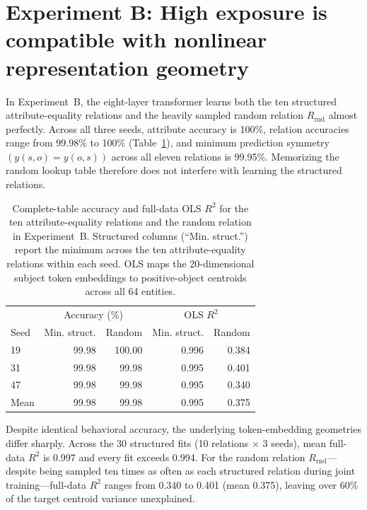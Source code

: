 \documentclass[11pt]{article}
\newcommand{\Rrnd}{R_{\mathrm{rnd}}}
\newcommand{\ExpTwoRandomRsq}{0.375}
\begin{document}
\section{Experiment B: High exposure is compatible with nonlinear representation geometry}
\label{sec:goal2-results}

In Experiment~B, the eight-layer transformer learns both the ten structured
attribute-equality relations and the heavily sampled random relation $\Rrnd$
almost perfectly. Across all three seeds, attribute accuracy is 100\%, relation
accuracies range from 99.98\% to 100\% (Table~\ref{tab:goal2}), and minimum
prediction symmetry $(y(s,o)=y(o,s))$ across all eleven relations is 99.95\%.
Memorizing the random lookup table therefore does not interfere with learning
the structured relations.

\begin{table}[t]
\centering
\small
\setlength{\tabcolsep}{3pt}
\begin{tabular}{lrrrr}
\toprule
 & \multicolumn{2}{c}{Accuracy (\%)} & \multicolumn{2}{c}{OLS $R^2$} \\
Seed & Min. struct. & Random & Min. struct. & Random \\
\midrule
19 & 99.98 & 100.00 & 0.996 & 0.384 \\
31 & 99.98 & 99.98 & 0.995 & 0.401 \\
47 & 99.98 & 99.98 & 0.995 & 0.340 \\
\midrule
Mean & 99.98 & 99.98 & 0.995 & 0.375 \\
\bottomrule
\end{tabular}
\caption{Complete-table accuracy and full-data OLS $R^2$
  for the ten attribute-equality
  relations and the random relation
  in Experiment~B.
Structured columns (``Min. struct.'') report the minimum across the ten attribute-equality
relations within each seed. OLS maps the 20-dimensional subject token embeddings
to positive-object centroids across all 64 entities.}
\label{tab:goal2}
\end{table}

Despite identical behavioral accuracy, the underlying token-embedding geometries
differ sharply. Across the 30 structured fits (10 relations $\times$ 3 seeds),
mean full-data $R^2$ is 0.997 and every fit exceeds 0.994. For the random
relation $\Rrnd$---despite being sampled ten times as often as each structured
relation during joint training---full-data $R^2$ ranges from 0.340 to 0.401
(mean \ExpTwoRandomRsq{}), leaving over 60\% of the target centroid variance
unexplained.
\end{document}

